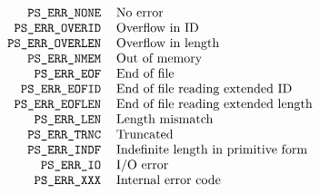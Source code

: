 
\normalsize
\[\begin{tabular}{rl}
\tt PS\_ERR\_NONE&	No error\\
\tt PS\_ERR\_OVERID&	Overflow in ID\\
\tt PS\_ERR\_OVERLEN&	Overflow in length\\
\tt PS\_ERR\_NMEM&	Out of memory\\
\tt PS\_ERR\_EOF&	End of file\\
\tt PS\_ERR\_EOFID&	End of file reading extended ID\\
\tt PS\_ERR\_EOFLEN&	End of file reading extended length\\
\tt PS\_ERR\_LEN&	Length mismatch\\
\tt PS\_ERR\_TRNC&	Truncated\\
\tt PS\_ERR\_INDF&	Indefinite length in primitive form\\
\tt PS\_ERR\_IO&	I/O error\\
\tt PS\_ERR\_XXX&	Internal error code
\end{tabular}\]
